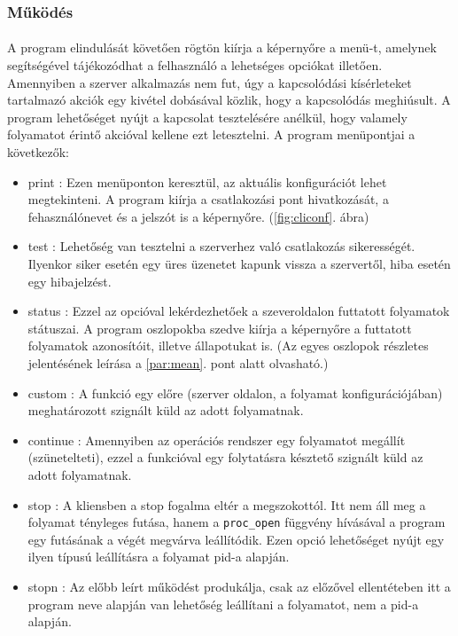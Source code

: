\documentclass[12pt]{report}
\begin{document}
  \subsubsection{Működés}\label{sec:cli_funcs}
  \paragraph{}
  A program elindulását követően rögtön kiírja a képernyőre a menü-t, amelynek segítségével tájékozódhat a felhasználó a lehetséges opciókat illetően. Amennyiben a szerver alkalmazás nem fut, úgy a kapcsolódási kísérleteket tartalmazó akciók egy kivétel dobásával közlik, hogy a kapcsolódás meghiúsult. A program lehetőséget nyújt a kapcsolat tesztelésére anélkül, hogy valamely folyamatot érintő akcióval kellene ezt letesztelni.
A program menüpontjai a következők:
\begin{itemize}
\item print : Ezen menüponton keresztül, az aktuális konfigurációt lehet megtekinteni. A program kiírja a csatlakozási pont hivatkozását, a fehasználónevet és a jelszót is a képernyőre. (\ref{fig:cliconf}. ábra)
\item test : Lehetőség van tesztelni a szerverhez való csatlakozás sikerességét. Ilyenkor siker esetén egy üres üzenetet kapunk vissza a szervertől, hiba esetén egy hibajelzést.
\item status : Ezzel az opcióval lekérdezhetőek a szeveroldalon futtatott folyamatok státuszai. A program oszlopokba szedve kiírja a képernyőre a futtatott folyamatok azonosítóit, illetve állapotukat is. (Az egyes oszlopok részletes jelentésének leírása a \ref{par:mean}. pont alatt olvasható.)
\item custom : A funkció egy előre (szerver oldalon, a folyamat konfigurációjában) meghatározott szignált küld az adott folyamatnak.
\item continue : Amennyiben az operációs rendszer egy folyamatot megállít (szünetelteti), ezzel a funkcióval egy folytatásra késztető szignált küld az adott folyamatnak.
\item stop : A kliensben a stop fogalma eltér a megszokottól. Itt nem áll meg a folyamat tényleges futása, hanem a \verb|proc_open| függvény hívásával a program egy futásának a végét megvárva leállítódik. Ezen opció lehetőséget nyújt egy ilyen típusú leállításra a folyamat pid-a alapján.
\item stopn : Az előbb leírt működést produkálja, csak az előzővel ellentéteben itt a program neve alapján van lehetőség leállítani a folyamatot, nem a pid-a alapján.

\end{itemize}
\end{document}
